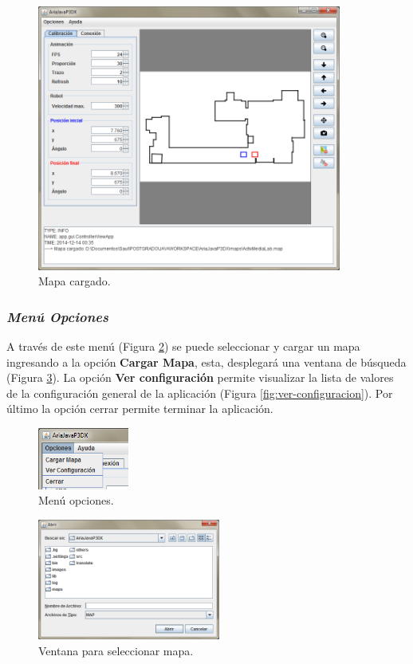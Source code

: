 \documentclass[11pt,twoside,A5]{article}
\newcommand{\reffigure}[1]{Figura \ref{#1}}
\newcommand{\refpfigure}[1]{(\reffigure{#1})}
\begin{document}
\begin{figure}[H]
\begin{center}
\includegraphics[width=10cm]{mapa-cargado.png} 
\caption{Mapa cargado.}
\label{fig:mapa-cargado}
\end{center}
\end{figure} 

\pagebreak
\subsubsection*{\textit{Menú Opciones}}

A través de este menú \refpfigure{fig:menu-opciones} se puede seleccionar y cargar un mapa ingresando 
a la opción \textbf{Cargar Mapa}, esta, desplegará una ventana de búsqueda \refpfigure{fig:cargar-mapa}.
La opción \textbf{Ver configuración} permite visualizar la lista de valores de la configuración general de la aplicación \refpfigure{fig:ver-configuracion}. Por último la opción cerrar permite terminar la aplicación.

\begin{figure}[H]
\begin{center}
\includegraphics[width=3cm]{menu-opciones2.png} 
\caption{Menú opciones.}
\label{fig:menu-opciones}
\end{center}
\end{figure} 

\begin{figure}[H]
\begin{center}
\includegraphics[width=6cm]{cargar-mapa.png} 
\caption{Ventana para seleccionar mapa.}
\label{fig:cargar-mapa}
\end{center}
\end{figure} 
\end{document}
